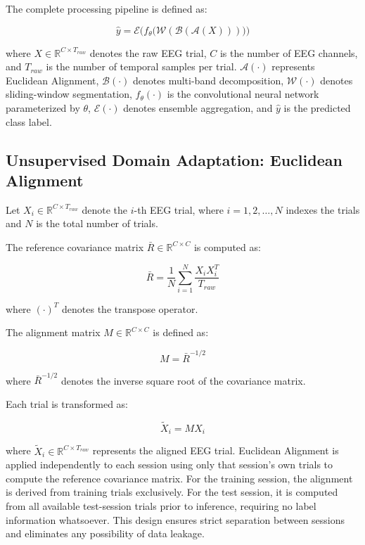 \documentclass[conference]{IEEEtran}
\begin{document}
The complete processing pipeline is defined as:

\begin{equation}
\hat{y} = \mathcal{E} \Big( f_{\theta} \big( \mathcal{W} ( \mathcal{B} ( \mathcal{A}(X) ) ) \big) \Big)
\end{equation}

where $X \in \mathbb{R}^{C \times T_{raw}}$ denotes the raw EEG trial, $C$ is the number of EEG channels, and $T_{raw}$ is the number of temporal samples per trial. $\mathcal{A}(\cdot)$ represents Euclidean Alignment, $\mathcal{B}(\cdot)$ denotes multi-band decomposition, $\mathcal{W}(\cdot)$ denotes sliding-window segmentation, $f_{\theta}(\cdot)$ is the convolutional neural network parameterized by $\theta$, $\mathcal{E}(\cdot)$ denotes ensemble aggregation, and $\hat{y}$ is the predicted class label.

\subsection{Unsupervised Domain Adaptation: Euclidean Alignment}

Let $X_i \in \mathbb{R}^{C \times T_{raw}}$ denote the $i$-th EEG trial, where $i = 1,2,\dots,N$ indexes the trials and $N$ is the total number of trials.

The reference covariance matrix $\bar{R} \in \mathbb{R}^{C \times C}$ is computed as:

\begin{equation}
\bar{R} = \frac{1}{N} \sum_{i=1}^{N} \frac{X_i X_i^T}{T_{raw}}
\end{equation}

where $(\cdot)^T$ denotes the transpose operator.

The alignment matrix $M \in \mathbb{R}^{C \times C}$ is defined as:

\begin{equation}
M = \bar{R}^{-1/2}
\end{equation}

where $\bar{R}^{-1/2}$ denotes the inverse square root of the covariance matrix.

Each trial is transformed as:

\begin{equation}
\tilde{X}_i = M X_i
\end{equation}

where $\tilde{X}_i \in \mathbb{R}^{C \times T_{raw}}$ represents the aligned EEG trial. Euclidean Alignment is applied independently to each session using only that session's own trials to compute the reference covariance matrix. For the training session, the alignment is derived from training trials exclusively. For the test session, it is computed from all available test-session trials prior to inference, requiring no label information whatsoever. This design ensures strict separation between sessions and eliminates any possibility of data leakage.
\end{document}
